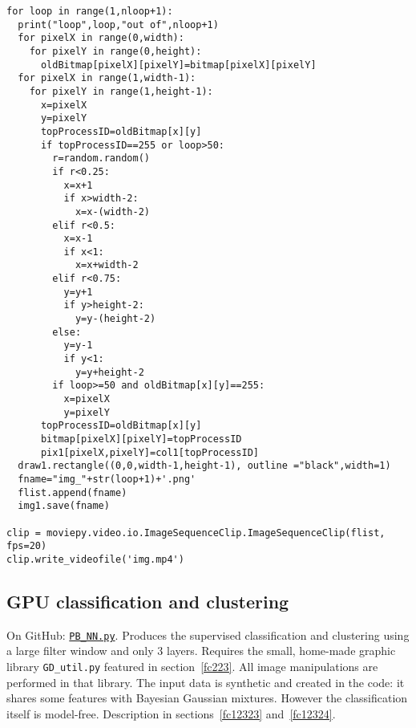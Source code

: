 \documentclass[oneside,10pt]{book}
\begin{document}
\begin{lstlisting}
for loop in range(1,nloop+1): 
  print("loop",loop,"out of",nloop+1) 
  for pixelX in range(0,width): 
    for pixelY in range(0,height): 
      oldBitmap[pixelX][pixelY]=bitmap[pixelX][pixelY]
  for pixelX in range(1,width-1): 
    for pixelY in range(1,height-1):   
      x=pixelX
      y=pixelY
      topProcessID=oldBitmap[x][y]
      if topProcessID==255 or loop>50: 
        r=random.random()
        if r<0.25: 
          x=x+1 
          if x>width-2: 
            x=x-(width-2)
        elif r<0.5:
          x=x-1 
          if x<1: 
            x=x+width-2
        elif r<0.75:
          y=y+1 
          if y>height-2: 
            y=y-(height-2)
        else:
          y=y-1 
          if y<1: 
            y=y+height-2         
        if loop>=50 and oldBitmap[x][y]==255:
          x=pixelX
          y=pixelY
      topProcessID=oldBitmap[x][y]  
      bitmap[pixelX][pixelY]=topProcessID
      pix1[pixelX,pixelY]=col1[topProcessID]
  draw1.rectangle((0,0,width-1,height-1), outline ="black",width=1)
  fname="img_"+str(loop+1)+'.png'
  flist.append(fname)   
  img1.save(fname)

clip = moviepy.video.io.ImageSequenceClip.ImageSequenceClip(flist, fps=20) 
clip.write_videofile('img.mp4')
\end{lstlisting}

\subsection{GPU classification and clustering}\label{fc222}

On GitHub: \href{https://github.com/VincentGranville/Point-Processes/blob/main/Source\%20Code/PB_NN.py}{\texttt{PB\_NN.py}}. Produces the supervised classification and clustering using a large filter window and only $3$ layers. Requires
 the small, home-made graphic library \texttt{GD\_util.py} featured in section~\ref{fc223}. All image manipulations are performed in that library. The input data is synthetic and created in the code: it shares some features with Bayesian Gaussian mixtures. However the classification itself is model-free. Description in sections~\ref{fc12323} and~\ref{fc12324}.  
\end{document}
